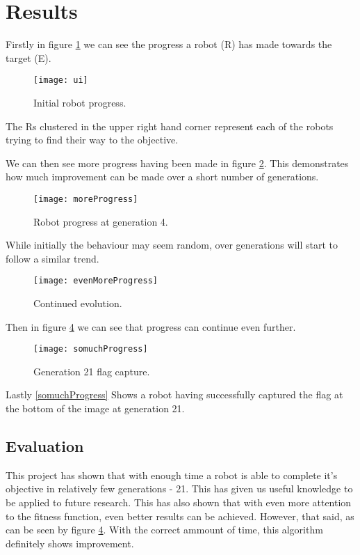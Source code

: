 \section{Results}
Firstly in figure \ref{robotProgress} we can see the progress a robot (R) has made towards the target (E). 

\begin{figure}
	\centering
	\texttt{[image: ui]}
	\caption{Initial robot progress.}
	\label{robotProgress}
\end{figure}

The Rs clustered in the upper right hand corner represent each of the robots trying to find their way to the objective.

We can then see more progress having been made in figure \ref{morerobotProgress}. This demonstrates how much improvement can be made over a short number of generations.
\begin{figure}
	\centering
	\texttt{[image: moreProgress]}
	\caption{Robot progress at generation 4.}
	\label{morerobotProgress}
\end{figure}

While initially the behaviour may seem random, over generations will start to follow a similar trend.

\begin{figure}
	\centering
	\texttt{[image: evenMoreProgress]}
	\caption{Continued evolution.}
	\label{evenmorerobotProgress}
\end{figure}
Then in figure \ref{evenmorerobotProgress} we can see that progress can continue even further. 

\begin{figure}
	\centering
	\texttt{[image: somuchProgress]}
	\caption{Generation 21 flag capture.}
	\label{evenmorerobotProgress}
\end{figure}
Lastly \ref{somuchProgress} Shows a robot having successfully captured the flag at the bottom of the image at generation 21. 

\subsection{Evaluation}

This project has shown that with enough time a robot is able to complete it's objective in relatively few generations - 21. This has given us useful knowledge to be applied to future research. This has also shown that with even more attention to the fitness function, even better results can be achieved. However, that said, as can be seen by figure \ref{evenmorerobotProgress}. With the correct ammount of time, this algorithm definitely shows improvement.